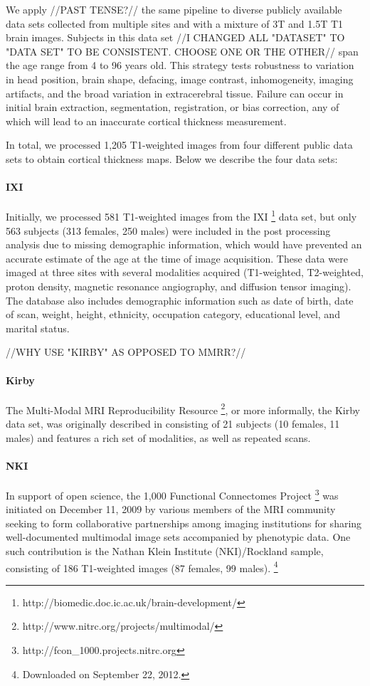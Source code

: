 We apply //PAST TENSE?// the same pipeline to diverse publicly available data sets collected
from multiple sites and with a mixture of 3T and
1.5T T1 brain images.  Subjects in this data set  //I CHANGED ALL "DATASET" TO "DATA SET" TO BE CONSISTENT. CHOOSE ONE OR THE OTHER//
span the age range from 4 to 96 years old.  This strategy tests robustness to
variation in head position, brain shape, defacing, image contrast, inhomogeneity, imaging
artifacts, and the broad variation in extracerebral tissue.  Failure
can occur in initial brain extraction, segmentation, registration, or
bias correction, any of which will lead to an inaccurate cortical
thickness measurement.                           

In total, we processed 1,205 T1-weighted images from four different
public data sets to obtain cortical thickness maps.
Below we describe the four data sets:
                                          
\paragraph{IXI}
Initially, we processed 581 T1-weighted images from the IXI%
\footnote{
http://biomedic.doc.ic.ac.uk/brain-development/
}
 data set, but only 563 subjects
(313 females, 250 males) were included in the post processing analysis due to 
missing demographic information, which would have prevented an accurate estimate of
the age at the time of image acquisition.  These data were
imaged at three sites 
with several modalities acquired (T1-weighted, T2-weighted, proton density, magnetic 
resonance angiography, and diffusion tensor imaging).  The 
database also includes demographic information such as date of birth, date
of scan, weight,
height, ethnicity, occupation category, educational level, and marital status.


//WHY USE "KIRBY" AS OPPOSED TO MMRR?//

\paragraph{Kirby}
The Multi-Modal MRI Reproducibility Resource%
\footnote{
http://www.nitrc.org/projects/multimodal/
}, 
or more informally, the Kirby
data set, was originally described in \cite{landman2011} consisting of 
21 subjects (10 females, 11 males) and features a rich set of modalities, as well as repeated scans.

\paragraph{NKI}
In support of open science, the 1,000 Functional Connectomes Project%
\footnote{ 
http://fcon\_1000.projects.nitrc.org
}
was initiated on December 11, 2009 by various members of the MRI community
seeking to form collaborative partnerships among imaging institutions for
sharing well-documented multimodal image sets accompanied by phenotypic data.
One such contribution is the Nathan Klein Institute (NKI)/Rockland sample,
consisting of 186 T1-weighted
images (87 females, 99 males).%
\footnote{
Downloaded on September 22, 2012.
}

